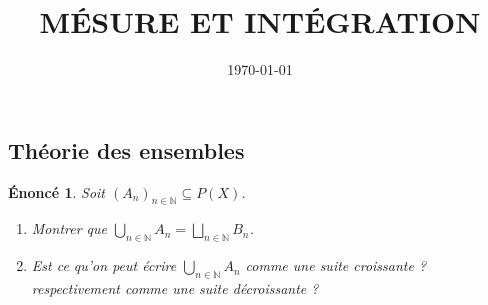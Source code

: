\documentclass[a4paper, 12pt, french]{article}
\title{MÉSURE ET INTÉGRATION}
\author{}
\date{\today}
\theoremstyle{break}
\newtheorem{enon}{Énoncé}[section]
\begin{document}
\maketitle

\begin{center}\section{Théorie des ensembles}\end{center}
\begin{enon}
       Soit $(A_{n})_{n \in \mathbb{N}} \subseteq P(X)$.
       \begin{enumerate}
               \item Montrer que  $\displaystyle\bigcup_{n \in \mathbb{N}} A_{n} =  \bigsqcup_{n \in \mathbb{N}} B_{n}$.
               \item Est ce qu'on peut écrire  $\displaystyle\bigcup_{n \in \mathbb{N} } A_{n}$ comme une suite croissante ? respectivement comme une suite décroissante ?
       \end{enumerate}
\end{enon}
\end{document}

